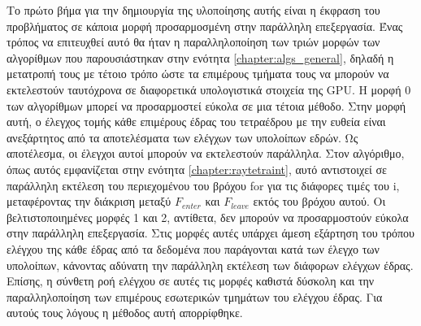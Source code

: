 Το πρώτο βήμα για την δημιουργία της υλοποίησης αυτής είναι η έκφραση του προβλήματος σε κάποια μορφή προσαρμοσμένη στην παράλληλη επεξεργασία. Ένας τρόπος να επιτευχθεί αυτό θα ήταν η παραλληλοποίηση των τριών μορφών των αλγορίθμων που παρουσιάστηκαν στην ενότητα \ref{chapter:algs_general}, δηλαδή η μετατροπή τους με τέτοιο τρόπο ώστε τα επιμέρους τμήματα τους να μπορούν να εκτελεστούν ταυτόχρονα σε διαφορετικά υπολογιστικά στοιχεία της GPU. Η μορφή 0 των αλγορίθμων μπορεί να προσαρμοστεί εύκολα σε μια τέτοια μέθοδο. Στην μορφή αυτή, ο έλεγχος τομής κάθε επιμέρους έδρας του τετραέδρου με την ευθεία είναι ανεξάρτητος από τα αποτελέσματα των ελέγχων των υπολοίπων εδρών. Ως αποτέλεσμα, οι έλεγχοι αυτοί μπορούν να εκτελεστούν παράλληλα. Στον αλγόριθμο, όπως αυτός εμφανίζεται στην ενότητα \ref{chapter:raytetraint}, αυτό αντιστοιχεί σε παράλληλη εκτέλεση του περιεχομένου του βρόχου for για τις διάφορες τιμές του i, μεταφέροντας την διάκριση μεταξύ $F_{enter}$ και $F_{leave}$ εκτός του βρόχου αυτού. Οι 
βελτιστοποιημένες  μορφές 1 και 2, αντίθετα, δεν μπορούν να προσαρμοστούν εύκολα στην παράλληλη επεξεργασία. Στις μορφές αυτές υπάρχει άμεση εξάρτηση του τρόπου ελέγχου της κάθε έδρας από τα δεδομένα που παράγονται κατά των έλεγχο των υπολοίπων, κάνοντας αδύνατη την παράλληλη εκτέλεση των διάφορων ελέγχων έδρας. Επίσης, η σύνθετη ροή ελέγχου σε αυτές τις μορφές καθιστά δύσκολη και την παραλληλοποίηση των επιμέρους εσωτερικών τμημάτων του ελέγχου έδρας. Για αυτούς τους λόγους η μέθοδος αυτή απορρίφθηκε.  

